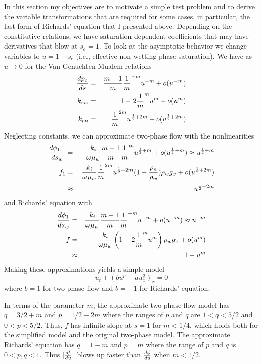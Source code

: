\documentclass[10pt,dvips,twoside,reqno]{amsart}
\begin{document}
In this section my objectives are to motivate a simple test problem
and to derive the variable transformations that are required for some
cases, in particular, the last form of Richards' equation that I
presented above. Depending on the constitutive relations, we have
saturation dependent coefficients that may have derivatives that blow
at $s_e=1$. To look at the asymptotic behavior we change variables to
$u=1-s_e$ (i.e., effective non-wetting phase saturation). We have as $u
\rightarrow 0$ for the Van Genuchten-Mualem relations
\begin{eqnarray}
\frac{d {p_c}}{d {s}} &=& \frac{m-1}{m}\frac{1}{m}^{-m} u^{-m} + o(u^{-m}) \label{eq:pcApp}\\
k_{rw} &=& 1-2 \frac{1}{m}^m u^m + o(u^m) \label{eq:kwApp} \\
k_{rn} &=& \frac{1}{m}^{2m} u^{\frac{1}{2}+2m} + o(u^{\frac{1}{2}+2m}) \label{eq:knApp}
\end{eqnarray}
Neglecting constants, we can approximate two-phase flow with the nonlinearities
\begin{eqnarray}
  \label{eq:twopSimpCoef}
  \frac{d {\phi_{1,1}}}{d {s_w}} &=& -\frac{k_i}{\omega \mu_w}\frac{m-1}{m}\frac{1}{m}^{m} u^{\frac{1}{2} + m}  + o(u^{\frac{1}{2} + m}) \approx   u^{\frac{1}{2}+m} \label{eq:blCoeffDapp}\\
  f_1 &=& \frac{k_i}{\omega \mu_w} \frac{1}{m}^{2m} u^{\frac{1}{2}+2m} (1 - \frac{\rho_n}{\rho_w}) \rho_wg_x + o(u^{\frac{1}{2}+2m}) \nonumber \\
&\approx&   u^{\frac{1}{2}+2m} \label{eq:blCoeffFapp}
\end{eqnarray}
and Richards' equation with
\begin{eqnarray}
  \frac{d {\phi_1}}{d {s_w}} &=& \frac{k_i}{\omega \mu_w}\frac{m-1}{m}\frac{1}{m}^{-m} u^{-m}+ o(u^{-m}) \approx   u^{-m} \label{eq:reCoeffDapp}\\
  f &=& -\frac{k_i}{\omega \mu_w} \left( 1-2 \frac{1}{m}^m u^m\right) \rho_w  g_x  + o(u^m) \nonumber \\
&\approx&   1-u^m \label{eq:reCoeffFapp}
\end{eqnarray}
Making these approximations yields a simple model
\begin{equation}
  u_t + (b u^p - a u^q_x)_x = 0 \label{eq:simpMod}
\end{equation}
where $b =1$ for two-phase flow and $b=-1$ for Richards' equation.

In terms of the parameter $m$, the approximate two-phase flow model
has $q = 3/2 + m$ and $p=1/2+2m$ where the ranges of $p$ and $q$ are
$1<q<5/2$ and $0<p<5/2$. Thus, $f$ has infinite slope at $s=1$ for
$m<1/4$, which holds both for the simplified model and the original
two-phase model. The approximate Richards' equation has $q=1-m$ and $p
= m$ where the range of $p$ and $q$ is $0<p,q<1$. Thus $|\frac{d {f}}{d {u}}|$
blows up faster than $\frac{d {\phi}}{d {u}}$ when $m < 1/2$.
\end{document}
